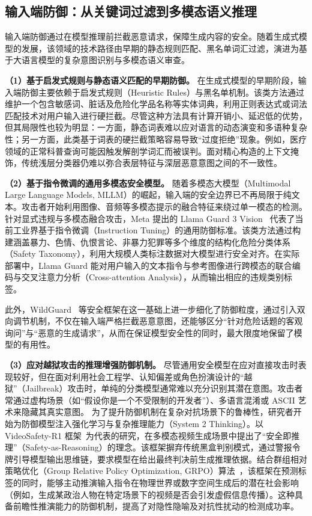 \subsection{输入端防御：从关键词过滤到多模态语义推理}

输入端防御通过在模型推理前拦截恶意请求，保障生成内容的安全。随着生成式模型的发展，该领域的技术路径由早期的静态规则匹配、黑名单词汇过滤，演进为基于大语言模型的复杂意图识别与多模态语义审查。

\textbf{（1）基于启发式规则与静态语义匹配的早期防御。}
在生成式模型的早期阶段，输入端防御主要依赖于启发式规则（Heuristic Rules）与黑名单机制。该类方法通过维护一个包含敏感词、脏话及危险化学品名称等实体词典，利用正则表达式或词法匹配技术对用户输入进行硬拦截。尽管这种方法具有计算开销小、延迟低的优势，但其局限性也较为明显：一方面，静态词表难以应对语言的动态演变和多语种复杂性；另一方面，此类基于词表的硬拦截策略容易导致“过度拒绝”现象。例如，医疗领域的正常科普查询可能因触发解剖学词汇而被误判。面对精心构造的上下文掩饰，传统浅层分类器仍难以弥合表层特征与深层恶意意图之间的不一致性。

\textbf{（2）基于指令微调的通用多模态安全模型。}
随着多模态大模型（Multimodal Large Language Models, MLLM）的崛起，输入端的安全边界已不再局限于纯文本。攻击者开始利用图像、音频等多模态提示的融合特征来绕过单一模态的检测。针对显式违规与多模态融合攻击，Meta 提出的 Llama Guard 3 Vision~\cite{chi2024llama} 代表了当前工业界基于指令微调（Instruction Tuning）的通用防御标准。该类方法通过构建涵盖暴力、色情、仇恨言论、非暴力犯罪等多个维度的结构化危险分类体系（Safety Taxonomy），利用大规模人类标注数据对大模型进行安全对齐。在实际部署中，Llama Guard 能对用户输入的文本指令与参考图像进行跨模态的联合编码与交叉注意力分析（Cross-attention Analysis），从而输出相应的违规类别标签。

此外，WildGuard~\cite{han2024wildguard} 等安全框架在这一基础上进一步细化了防御粒度，通过引入双向调节机制，不仅在输入端严格拦截恶意意图，还能够区分“针对危险话题的客观询问”与“恶意的生成请求”，从而在保证模型安全性的同时，最大限度地保留了模型的有用性。

\textbf{（3）应对越狱攻击的推理增强防御机制。}
尽管通用安全模型在应对直接攻击时表现较好，但在面对利用社会工程学、认知偏差或角色扮演设计的“越狱”（Jailbreak）攻击时，单纯的分类模型通常难以充分识别其潜在意图。攻击者常通过虚构场景（如“假设你是一个不受限制的开发者”）、多语言混淆或 ASCII 艺术来隐藏其真实意图。
为了提升防御机制在复杂对抗场景下的鲁棒性，研究者开始为防御模型注入强化学习与复杂推理能力（System 2 Thinking）。以 VideoSafety-R1 框架~\cite{sun2025evaluation}为代表的研究，在多模态视频生成场景中提出了“安全即推理”（Safety-as-Reasoning）的理念。该框架摒弃传统黑盒判别模式，通过警报令牌引导模型输出思维链，要求模型在给出最终判决前生成推理依据。结合群组相对策略优化（Group Relative Policy Optimization, GRPO）算法~\cite{grpo}，该框架在预测标签的同时，能够主动推演输入指令在物理世界或数字空间生成后的潜在社会影响（例如，生成某政治人物在特定场景下的视频是否会引发虚假信息传播）。这种具备前瞻性推演能力的防御机制，提高了对隐性隐喻及对抗性扰动的检测成功率。

